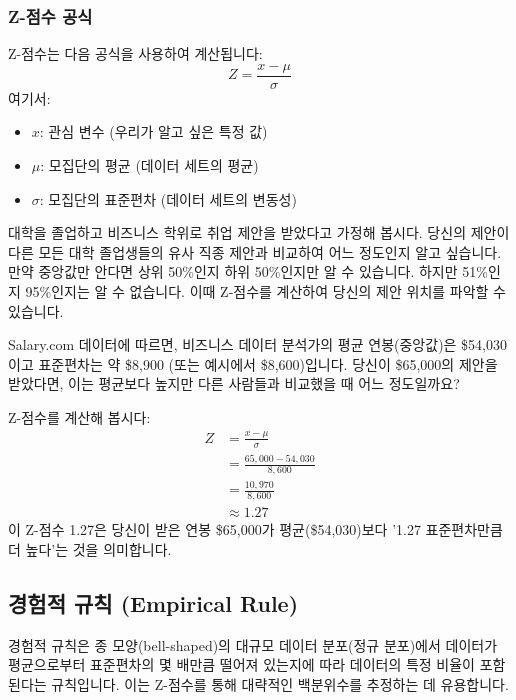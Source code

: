 \documentclass[11pt,a4paper]{book}
\theoremstyle{definition}
\begin{document}
\subsubsection*{Z-점수 공식}
Z-점수는 다음 공식을 사용하여 계산됩니다:
\[ Z = \frac{x - \mu}{\sigma} \]
여기서:
\begin{itemize}
    \item \(x\): 관심 변수 (우리가 알고 싶은 특정 값)
    \item \(\mu\): 모집단의 평균 (데이터 세트의 평균)
    \item \(\sigma\): 모집단의 표준편차 (데이터 세트의 변동성)
\end{itemize}

\begin{examplebox}[title=Z-점수 예시: 연봉 비교]
대학을 졸업하고 비즈니스 학위로 취업 제안을 받았다고 가정해 봅시다. 당신의 제안이 다른 모든 대학 졸업생들의 유사 직종 제안과 비교하여 어느 정도인지 알고 싶습니다. 만약 중앙값만 안다면 상위 50\%인지 하위 50\%인지만 알 수 있습니다. 하지만 51\%인지 95\%인지는 알 수 없습니다. 이때 Z-점수를 계산하여 당신의 제안 위치를 파악할 수 있습니다.

Salary.com 데이터에 따르면, 비즈니스 데이터 분석가의 평균 연봉(중앙값)은 \$54,030이고 표준편차는 약 \$8,900 (또는 예시에서 \$8,600)입니다. 당신이 \$65,000의 제안을 받았다면, 이는 평균보다 높지만 다른 사람들과 비교했을 때 어느 정도일까요?

Z-점수를 계산해 봅시다:
\begin{align*} Z &= \frac{x - \mu}{\sigma} \\ &= \frac{65,000 - 54,030}{8,600} \\ &= \frac{10,970}{8,600} \\ &\approx 1.27 \end{align*}
이 Z-점수 1.27은 당신이 받은 연봉 \$65,000가 평균(\$54,030)보다 '1.27 표준편차만큼 더 높다'는 것을 의미합니다.
\end{examplebox}


\subsection{경험적 규칙 (Empirical Rule)}

\begin{summarybox}[title=경험적 규칙 핵심 요약]
경험적 규칙은 종 모양(bell-shaped)의 대규모 데이터 분포(정규 분포)에서 데이터가 평균으로부터 표준편차의 몇 배만큼 떨어져 있는지에 따라 데이터의 특정 비율이 포함된다는 규칙입니다. 이는 Z-점수를 통해 대략적인 백분위수를 추정하는 데 유용합니다.
\end{summarybox}
\end{document}
